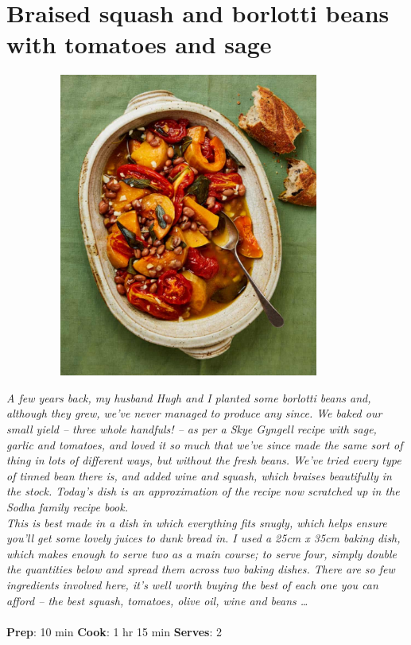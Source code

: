 \documentclass{book}
\begin{document}
\section{Braised squash and borlotti beans with tomatoes and sage}
\begin{figure}
\centering\includegraphics[width=10cm,height=10cm,keepaspectratio]{Recipe_Pictures/Braised_squash_and_borlotti_beans_with_tomatoes_and_sage.png}
\end{figure}
\emph{A few years back, my husband Hugh and I planted some borlotti beans and, although they grew, we’ve never managed to produce any since. We baked our small yield – three whole handfuls! – as per a Skye Gyngell recipe with sage, garlic and tomatoes, and loved it so much that we’ve since made the same sort of thing in lots of different ways, but without the fresh beans. We’ve tried every type of tinned bean there is, and added wine and squash, which braises beautifully in the stock. Today’s dish is an approximation of the recipe now scratched up in the Sodha family recipe book.\\ 
This is best made in a dish in which everything fits snugly, which helps ensure you’ll get some lovely juices to dunk bread in. I used a 25cm x 35cm baking dish, which makes enough to serve two as a main course; to serve four, simply double the quantities below and spread them across two baking dishes. There are so few ingredients involved here, it’s well worth buying the best of each one you can afford – the best squash, tomatoes, olive oil, wine and beans …}\\\\ 
\textbf{Prep}: 10 min
\textbf{Cook}: 1 hr 15 min
\textbf{Serves}: 2
\end{document}
